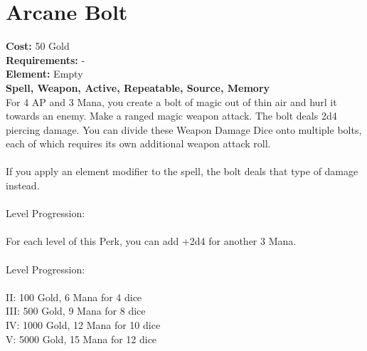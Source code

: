 \section{Arcane Bolt}
\textbf{Cost:} 50 Gold\\
\textbf{Requirements:} -\\
\textbf{Element:} Empty\\
\textbf{Spell, Weapon, Active, Repeatable, Source, Memory}\\
For 4 AP and 3 Mana, you create a bolt of magic out of thin air and hurl it towards an enemy. Make a ranged magic weapon attack. The bolt deals 2d4 piercing damage. You can divide these Weapon Damage Dice onto multiple bolts, each of which requires its own additional weapon attack roll.\\
\\
If you apply an element modifier to the spell, the bolt deals that type of damage instead.\\
\\
Level Progression:\\
\\
For each level of this Perk, you can add +2d4 for another 3 Mana. \\
\\
Level Progression:\\
\\
II: 100 Gold, 6 Mana for 4 dice\\
III: 500 Gold, 9 Mana for 8 dice\\
IV: 1000 Gold, 12 Mana for 10 dice\\
V: 5000 Gold, 15 Mana for 12 dice\\